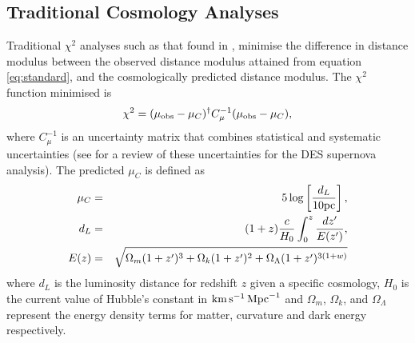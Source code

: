 \documentclass[twocolumn,trackchanges,tighten]{aastex62}
\newcommand{\kmsmpc}{{\rm km}\,{\rm s}^{-1}\,{\rm Mpc}^{-1}}
\begin{document}
\subsection{Traditional Cosmology Analyses} \label{sec:traditional}

Traditional $\chi^2$ analyses such as that found in \citet{Riess1998, Perlmutter1999, Wood-Vasey2007, Kowalski2008, Kessler2009, Conley2011, Betoule2014}, minimise the difference in distance modulus between the observed distance modulus attained from equation \ref{eq:standard}, and the cosmologically predicted distance modulus. The $\chi^2$ function minimised is
\begin{equation}
\chi^2 = (\mu_{\rm obs} - \mu_C)^\dagger C^{-1}_{\mu} (\mu_{\rm obs} - \mu_C),
\end{equation}
where $C^{-1}_{\mu}$ is an uncertainty matrix that combines statistical and systematic uncertainties (see \citet{Brout18SYS} for a review of these uncertainties for the DES supernova analysis). The predicted $\mu_C$ is defined as
\begin{eqnarray}
\mu_C &=& 5 \log\left[ \frac{d_L}{10{\rm pc}} \right], \label{eq:mu0}\\
d_L &=& (1+z)\frac{c}{H_0} \int_0^z \frac{dz'}{E(z')},\\
E(z) &=& \sqrt{ \Omega_m (1+z')^3 + \Omega_k (1 + z')^2 + \Omega_\Lambda (1+z')^{3(1+w)}}
\end{eqnarray}
where $d_L$ is the luminosity distance for redshift $z$ given a specific cosmology, $H_0$ is the current value of Hubble's constant in $\kmsmpc$ and $\Omega_m$, $\Omega_k$, and $\Omega_\Lambda$ represent the energy density terms for matter, curvature and dark energy respectively.
\end{document}
